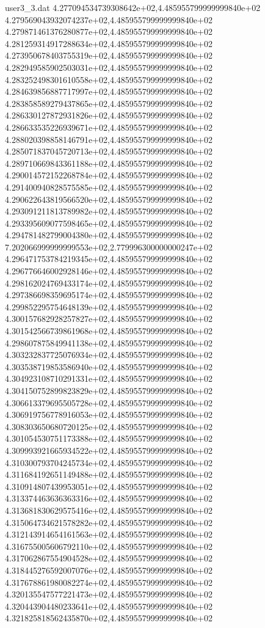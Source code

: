 \begin{filecontents}{user3_3.dat}
4.277094534739308642e+02,4.485955799999999840e+02
4.279569043932074237e+02,4.485955799999999840e+02
4.279871461376280877e+02,4.485955799999999840e+02
4.281259314917288634e+02,4.485955799999999840e+02
4.273950678403755319e+02,4.485955799999999840e+02
4.282949585902503031e+02,4.485955799999999840e+02
4.283252498301610558e+02,4.485955799999999840e+02
4.284639856887717997e+02,4.485955799999999840e+02
4.283858589279437865e+02,4.485955799999999840e+02
4.286330127872931826e+02,4.485955799999999840e+02
4.286633535226939671e+02,4.485955799999999840e+02
4.288020398858146791e+02,4.485955799999999840e+02
4.285071837045720713e+02,4.485955799999999840e+02
4.289710669843361188e+02,4.485955799999999840e+02
4.290014572152268784e+02,4.485955799999999840e+02
4.291400940828575585e+02,4.485955799999999840e+02
4.290622643819566520e+02,4.485955799999999840e+02
4.293091211813789982e+02,4.485955799999999840e+02
4.293395609077598465e+02,4.485955799999999840e+02
4.294781482799004380e+02,4.485955799999999840e+02
7.202066999999999553e+02,2.779996300000000247e+02
4.296471753784219345e+02,4.485955799999999840e+02
4.296776646002928146e+02,4.485955799999999840e+02
4.298162024769433174e+02,4.485955799999999840e+02
4.297386698359695174e+02,4.485955799999999840e+02
4.299852295754648139e+02,4.485955799999999840e+02
4.300157682928257827e+02,4.485955799999999840e+02
4.301542566739861968e+02,4.485955799999999840e+02
4.298607875849941138e+02,4.485955799999999840e+02
4.303232837725076934e+02,4.485955799999999840e+02
4.303538719853586940e+02,4.485955799999999840e+02
4.304923108710291331e+02,4.485955799999999840e+02
4.304150752899823829e+02,4.485955799999999840e+02
4.306613379695505728e+02,4.485955799999999840e+02
4.306919756778916053e+02,4.485955799999999840e+02
4.308303650680720125e+02,4.485955799999999840e+02
4.301054530751173388e+02,4.485955799999999840e+02
4.309993921665934522e+02,4.485955799999999840e+02
4.310300793704245734e+02,4.485955799999999840e+02
4.311684192651149488e+02,4.485955799999999840e+02
4.310914807439953051e+02,4.485955799999999840e+02
4.313374463636363316e+02,4.485955799999999840e+02
4.313681830629575416e+02,4.485955799999999840e+02
4.315064734621578282e+02,4.485955799999999840e+02
4.312143914654161563e+02,4.485955799999999840e+02
4.316755005606792110e+02,4.485955799999999840e+02
4.317062867554904528e+02,4.485955799999999840e+02
4.318445276592007076e+02,4.485955799999999840e+02
4.317678861980082274e+02,4.485955799999999840e+02
4.320135547577221473e+02,4.485955799999999840e+02
4.320443904480233641e+02,4.485955799999999840e+02
4.321825818562435870e+02,4.485955799999999840e+02

\end{filecontents}
